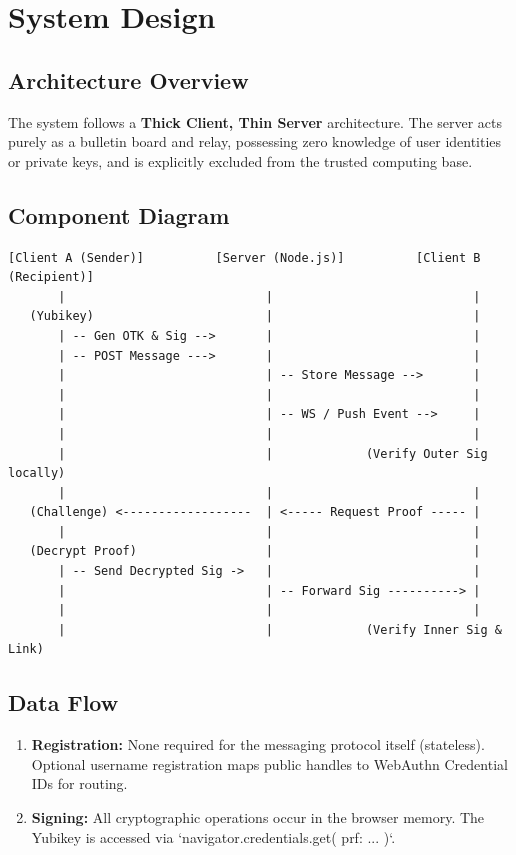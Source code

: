 \documentclass[letterpaper,11pt]{article}
\begin{document}
\section{System Design}

\subsection{Architecture Overview}
The system follows a \textbf{Thick Client, Thin Server} architecture. The server acts purely as a bulletin board and relay, possessing zero knowledge of user identities or private keys, and is explicitly excluded from the trusted computing base.

\subsection{Component Diagram}
\begin{verbatim}
[Client A (Sender)]          [Server (Node.js)]          [Client B (Recipient)]
       |                            |                            |
   (Yubikey)                        |                            |
       | -- Gen OTK & Sig -->       |                            |
       | -- POST Message --->       |                            |
       |                            | -- Store Message -->       |
       |                            |                            |
       |                            | -- WS / Push Event -->     |
       |                            |                            |
       |                            |             (Verify Outer Sig locally)
       |                            |                            |
   (Challenge) <------------------  | <----- Request Proof ----- |
       |                            |                            |
   (Decrypt Proof)                  |                            |
       | -- Send Decrypted Sig ->   |                            |
       |                            | -- Forward Sig ----------> |
       |                            |                            |
       |                            |             (Verify Inner Sig & Link)
\end{verbatim}

\subsection{Data Flow}
\begin{enumerate}
    \item \textbf{Registration:} None required for the messaging protocol itself (stateless). Optional username registration maps public handles to WebAuthn Credential IDs for routing.
    \item \textbf{Signing:} All cryptographic operations occur in the browser memory. The Yubikey is accessed via `navigator.credentials.get({ prf: ... })`.
\end{enumerate}
\end{document}
